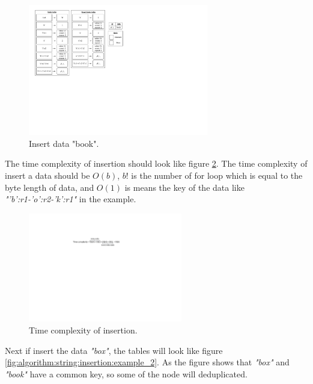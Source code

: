 \begin{figure}[h]
\centering
\includegraphics[width=0.7\textwidth]{./algorithm/string/pic/insertion/example_1_v5.pdf}
\caption{Insert data "book".}
\label{fig:algorithm:string:insertion:example_1}
\end{figure}

The time complexity of insertion should look like figure \ref{fig:algorithm:string:insertion:time_complexity}. The time complexity of insert a data should be $O(b)$, $b!$ is the number of for loop which is equal to the byte length of data, and $O(1)$ is means the key of the data like \textit{"'b':r1-'o':r2-'k':r1"} in the example.\\

\begin{figure}[h]
\centering
\includegraphics[width=0.6\textwidth]{./algorithm/string/pic/insertion/time_complexity_v5.pdf}
\caption{Time complexity of insertion.}
\label{fig:algorithm:string:insertion:time_complexity}
\end{figure}

Next if insert the data \textit{"box"}, the tables will look like figure \ref{fig:algorithm:string:insertion:example_2}. As the figure shows that \textit{"box"} and \textit{"book"} have a common key, so some of the node will deduplicated.

